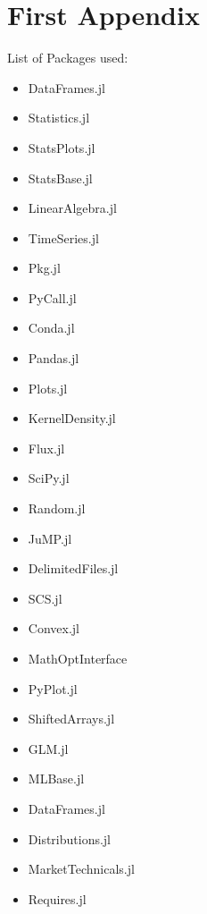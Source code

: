 \appendix
\chapter{First Appendix}
\label{app: first}

\noindent List of Packages used:
\begin{itemize}
\label{appendix: pack_list}
    \item DataFrames.jl
    \item Statistics.jl
    \item StatsPlots.jl
    \item StatsBase.jl
    \item LinearAlgebra.jl
    \item TimeSeries.jl
    \item Pkg.jl
    \item PyCall.jl
    \item Conda.jl
    \item Pandas.jl
    \item Plots.jl
    \item KernelDensity.jl
    \item Flux.jl
    \item SciPy.jl
    \item Random.jl
    \item JuMP.jl
    \item DelimitedFiles.jl
    \item SCS.jl
    \item Convex.jl
    \item MathOptInterface
    \item PyPlot.jl
    \item ShiftedArrays.jl
    \item GLM.jl
    \item MLBase.jl
    \item DataFrames.jl
    \item Distributions.jl
    \item MarketTechnicals.jl
    \item Requires.jl
\end{itemize}


